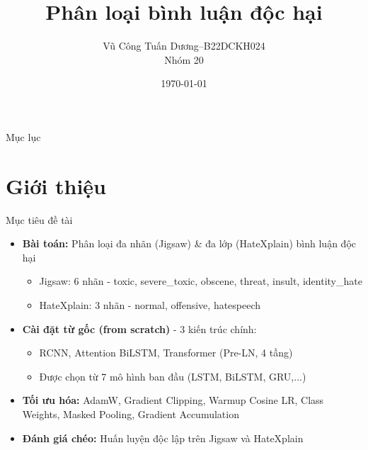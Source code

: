 \documentclass[serif, aspectratio=169]{beamer}
\author{Vũ Công Tuấn Dương--B22DCKH024\\Nhóm 20}
\title{Phân loại bình luận độc hại}
\institute{Khoa CNTT1 -- PTIT}
\date{\small \today}
\begin{document}
\begin{frame}
    \titlepage
\end{frame}

\begin{frame}{Mục lục}
    \tableofcontents
\end{frame}

\section{Giới thiệu}

\begin{frame}{Mục tiêu đề tài}
\begin{itemize}
    \item \textbf{Bài toán:} Phân loại đa nhãn (Jigsaw) \& đa lớp (HateXplain) bình luận độc hại
    \begin{itemize}
        \item Jigsaw: 6 nhãn - toxic, severe\_toxic, obscene, threat, insult, identity\_hate
        \item HateXplain: 3 nhãn - normal, offensive, hatespeech
    \end{itemize}
    \item \textbf{Cài đặt từ gốc (from scratch)} - 3 kiến trúc chính:
    \begin{itemize}
        \item RCNN, Attention BiLSTM, Transformer (Pre-LN, 4 tầng)
        \item Được chọn từ 7 mô hình ban đầu (LSTM, BiLSTM, GRU,...)
    \end{itemize}
    \item \textbf{Tối ưu hóa:} AdamW, Gradient Clipping, Warmup Cosine LR, Class Weights, Masked Pooling, Gradient Accumulation
    \item \textbf{Đánh giá chéo:} Huấn luyện độc lập trên Jigsaw và HateXplain
\end{itemize}
\end{frame}
\end{document}
